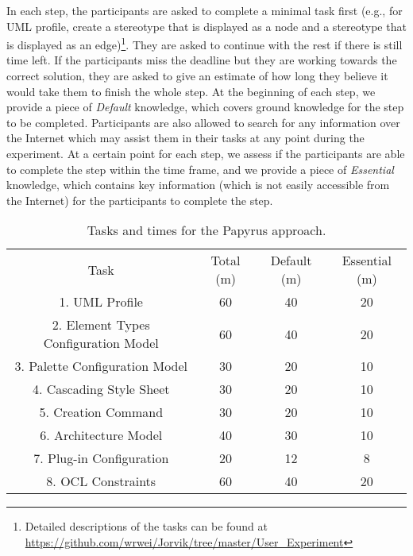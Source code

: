 In each step, the participants are asked to complete a minimal task first (e.g., for UML profile, create a stereotype that is displayed as a node and a stereotype that is displayed as an edge)\footnote{Detailed descriptions of the tasks can be found at \url{https://github.com/wrwei/Jorvik/tree/master/User_Experiment}}. 
They are asked to continue with the rest if there is still time left. 
If the participants miss the deadline but they are working towards the correct solution, they are asked to give an estimate of how long they believe it would take them to finish the whole step.
At the beginning of each step, we provide a piece of \textit{Default} knowledge, which covers ground knowledge for the step to be completed. 
Participants are also allowed to search for any information over the Internet which may assist them in their tasks at any point during the experiment.
At a certain point for each step, we assess if the participants are able to complete the step within the time frame, and we provide a piece of \textit{Essential} knowledge, which contains key information (which is not easily accessible from the Internet) for the participants to complete the step.

\begin{table}[ht!]
	\centering
	\setlength{\tabcolsep}{3.5pt} 
	\begin{tabular}{|c|c|c|c|}
		Task & Total (m) & Default (m) & Essential (m) \\ 
		1. UML Profile & 60 & 40 & 20 \\
		2. Element Types Configuration Model & 60 & 40 & 20 \\
		3. Palette Configuration Model & 30 & 20 & 10 \\
		4. Cascading Style Sheet & 30 & 20 & 10 \\
		5. Creation Command & 30 & 20 & 10 \\
		6. Architecture Model & 40 & 30 & 10 \\
		7. Plug-in Configuration & 20 & 12 & 8 \\
		8. OCL Constraints & 60 & 40 & 20 \\
	\end{tabular}
	\caption{Tasks and times for the Papyrus approach.}
	\label{tab:manual}
\end{table}


